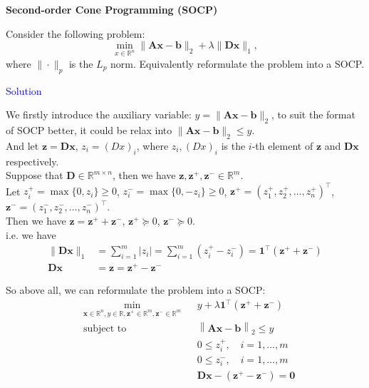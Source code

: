 \item[\uppercase\expandafter{\romannumeral2}.]\textbf{Second-order Cone Programming (SOCP)}

Consider the following problem:
$$
\min_{x\in\mathbb R^n} \|\mathbf{Ax-b}\|_2+\lambda \|\mathbf{Dx}\|_1,
$$
where $\|\cdot\|_p$ is the $L_p$ norm. Equivalently reformulate the problem into a SOCP. 

\textcolor{blue}{Solution}

We firstly introduce the auxiliary variable: $y=\|\pmb {Ax-b}\|_2$, to suit the format of SOCP better, it could be relax into $\|\pmb {Ax-b}\|_2\leq y$. \\

And let $\pmb z = \pmb {Dx}$, $z_i=(Dx)_i$, where $z_i,(Dx)_i$ is the $i$-th element of $\pmb z$ and $\pmb {Dx}$ respectively. \\
Suppose that $\pmb D\in \mathbb{R}^{m\times n}$, then we have $\pmb z, \pmb z^+, \pmb z^-\in\mathbb R^m$. \\
Let $z_i^+ = \max\{0,z_i\}\geq 0$, $z_i^- = \max\{0,-z_i\}\geq 0$, $\pmb z^+ = \left(z_1^+,z_2^+,\ldots,z_n^+\right)^{\top}$, $\pmb z^- = \left(z_1^-,z_2^-,\ldots,z_n^-\right)^{\top}$. \\
Then we have $\pmb z = \pmb z^+ + \pmb z^-$, $\pmb z^+ \succeq 0$, $\pmb z^- \succeq 0$. \\
i.e. we have
\begin{align*}
\|\pmb{Dx}\|_1 &= \sum_{i=1}^m \left|z_i\right| = \sum_{i=1}^m \left(z_i^+ - z_i^-\right) = \pmb 1^{\top} \left(\pmb z^+ + \pmb z^-\right) \\
\pmb {Dx} &= \pmb z = \pmb z^+ - \pmb z^-
\end{align*}

So above all, we can reformulate the problem into a SOCP:
\[\begin{aligned}
&\min_{\pmb x\in\mathbb R^n,y\in\mathbb R,\pmb z^+\in\mathbb R^m,\pmb z^-\in\mathbb R^m} && y+\lambda\pmb 1^{\top} \left(\pmb z^+ + \pmb z^-\right) \\
&\text{subject to} && \left\|\pmb {Ax-b}\right\|_2\leq y \\
& && 0 \leq z_i^+, \quad i=1,\ldots,m \\
& && 0 \leq z_i^-, \quad i=1,\ldots,m \\
& && \pmb {Dx} - \left(\pmb z^+ - \pmb z^-\right) = \pmb 0
\end{aligned}
\]

\newpage
